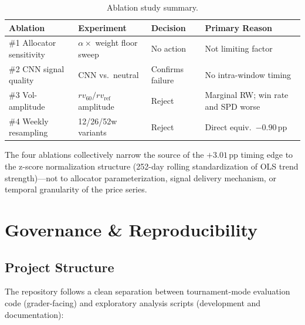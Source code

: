 \documentclass[11pt,letterpaper]{article}
\begin{document}
\begin{table}[H]
  \centering
  \caption{Ablation study summary.}
  \label{tab:abl_summary}
  \begin{tabular}{p{2.4cm}p{4cm}lp{4cm}}
    \toprule
    \textbf{Ablation} & \textbf{Experiment} & \textbf{Decision}
    & \textbf{Primary Reason} \\
    \midrule
    \#1 Allocator sensitivity
      & $\alpha \times$ weight floor sweep
      & No action
      & Not limiting factor \\[4pt]
    \#2 CNN signal quality
      & CNN vs.\ neutral
      & Confirms failure
      & No intra-window timing \\[4pt]
    \#3 Vol-amplitude
      & $rv_{60}/rv_{\text{ref}}$ amplitude
      & Reject
      & Marginal RW; win rate and SPD worse \\[4pt]
    \#4 Weekly resampling
      & 12/26/52w variants
      & Reject
      & Direct equiv.\ $-0.90$\,pp \\
    \bottomrule
  \end{tabular}
\end{table}

The four ablations collectively narrow the source of the $+3.01$\,pp timing edge
to the z-score normalization structure (252-day rolling standardization of OLS
trend strength)---not to allocator parameterization, signal delivery mechanism,
or temporal granularity of the price series.

\section{Governance \& Reproducibility}
\label{sec:governance}

\subsection{Project Structure}

The repository follows a clean separation between tournament-mode evaluation
code (grader-facing) and exploratory analysis scripts (development and
documentation):
\end{document}
